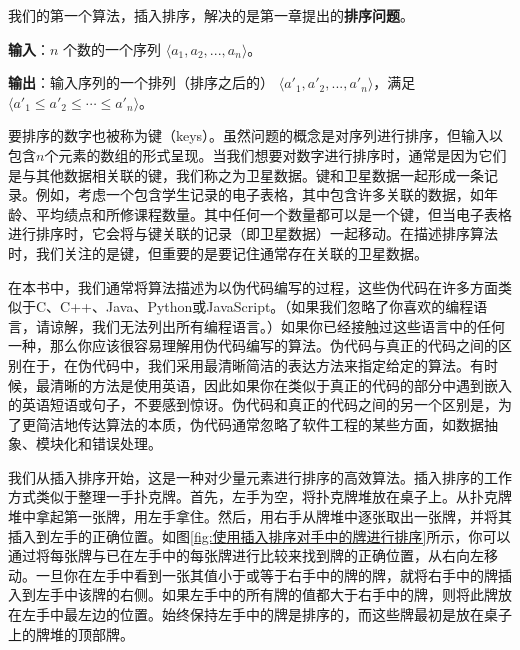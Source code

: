 \documentclass[lang=cn,newtx,10pt,scheme=chinese]{elegantbook}
\begin{document}
我们的第一个算法，插入排序，解决的是第一章提出的\textbf{排序问题}。

\textbf{输入}：$n$ 个数的一个序列 $\langle a_1, a_2, ..., a_n\rangle$。

\textbf{输出}：输入序列的一个排列（排序之后的） $\langle{a'_1,a'_2,...,a'_n}\rangle$，满足$\langle{a'_1\le a'_2\le \cdots\le a'_n}\rangle$。

要排序的数字也被称为键（keys）。虽然问题的概念是对序列进行排序，但输入以包含$n$个元素的数组的形式呈现。当我们想要对数字进行排序时，通常是因为它们是与其他数据相关联的键，我们称之为卫星数据。键和卫星数据一起形成一条记录。例如，考虑一个包含学生记录的电子表格，其中包含许多关联的数据，如年龄、平均绩点和所修课程数量。其中任何一个数量都可以是一个键，但当电子表格进行排序时，它会将与键关联的记录（即卫星数据）一起移动。在描述排序算法时，我们关注的是键，但重要的是要记住通常存在关联的卫星数据。

在本书中，我们通常将算法描述为以伪代码编写的过程，这些伪代码在许多方面类似于C、C++、Java、Python或JavaScript。（如果我们忽略了你喜欢的编程语言，请谅解，我们无法列出所有编程语言。）如果你已经接触过这些语言中的任何一种，那么你应该很容易理解用伪代码编写的算法。伪代码与真正的代码之间的区别在于，在伪代码中，我们采用最清晰简洁的表达方法来指定给定的算法。有时候，最清晰的方法是使用英语，因此如果你在类似于真正的代码的部分中遇到嵌入的英语短语或句子，不要感到惊讶。伪代码和真正的代码之间的另一个区别是，为了更简洁地传达算法的本质，伪代码通常忽略了软件工程的某些方面，如数据抽象、模块化和错误处理。

我们从插入排序开始，这是一种对少量元素进行排序的高效算法。插入排序的工作方式类似于整理一手扑克牌。首先，左手为空，将扑克牌堆放在桌子上。从扑克牌堆中拿起第一张牌，用左手拿住。然后，用右手从牌堆中逐张取出一张牌，并将其插入到左手的正确位置。如图\ref{fig:使用插入排序对手中的牌进行排序}所示，你可以通过将每张牌与已在左手中的每张牌进行比较来找到牌的正确位置，从右向左移动。一旦你在左手中看到一张其值小于或等于右手中的牌的牌，就将右手中的牌插入到左手中该牌的右侧。如果左手中的所有牌的值都大于右手中的牌，则将此牌放在左手中最左边的位置。始终保持左手中的牌是排序的，而这些牌最初是放在桌子上的牌堆的顶部牌。
\end{document}
